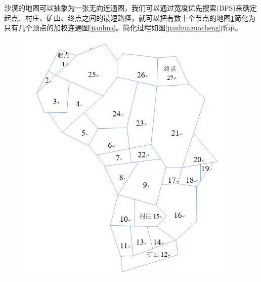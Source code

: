 \documentclass[withoutpreface,bwprint]{cumcmthesis} %
\begin{document}
沙漠的地图可以抽象为一张无向连通图，我们可以通过宽度优先搜索(BFS)来确定起点、村庄、矿山、终点之间的最短路径，就可以把有数十个节点的地图\ref{dt}简化为只有几个顶点的加权连通图\ref{jianhua}。简化过程如图\ref{jianhuaguocheng}所示。

\begin{figure}
    \centering
    \begin{minipage}[c]{0.45\textwidth}
        \centering
        \includegraphics[width=0.95\textwidth]{figures/dt.png}
        \label{dt}
    \end{minipage}
    \begin{minipage}[c]{0.45\textwidth}
        \centering

\end{minipage}
\end{figure}
\end{document}
